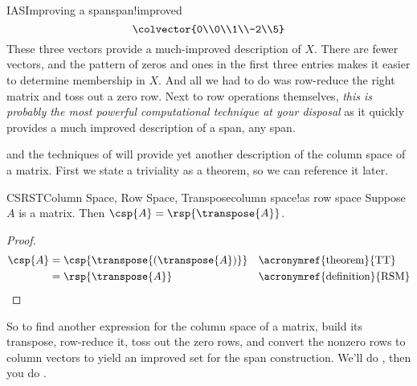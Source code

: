 \begin{example}{IAS}{Improving a span}{span!improved}
\begin{equation*}
{{\colvector{0\\0\\1\\-2\\5}
}}
\end{equation*}
%
These three vectors provide a much-improved description of $X$.  There are fewer vectors, and the pattern of zeros and ones in the first three entries makes it easier to determine membership in $X$.  And all we had to do was row-reduce the right matrix and toss out a zero row.  Next to row operations themselves, {\em this is probably the most powerful computational technique at your disposal} as it quickly provides a much improved description of a span, any span.
%
\end{example}
%
 and the techniques of  will provide yet another description of the column space of a matrix.  First we state a triviality as a theorem, so we can reference it later.
%
\begin{theorem}{CSRST}{Column Space, Row Space, Transpose}{column space!as row space}
Suppose $A$ is a matrix.  Then $\csp{A}=\rsp{\transpose{A}}$.
\end{theorem}
%
\begin{proof}
%
\begin{align*}
\csp{A}
&=\csp{\transpose{\left(\transpose{A}\right)}}
&&\text{\acronymref{theorem}{TT}}\\
%
&=\rsp{\transpose{A}}
&&\text{\acronymref{definition}{RSM}}
%
\end{align*}
%
\end{proof}
%
So to find another expression for the column space of a matrix, build its transpose, row-reduce it, toss out the zero rows, and convert the nonzero rows to column vectors to yield an improved set for the span construction.  We'll do , then you do .
%
